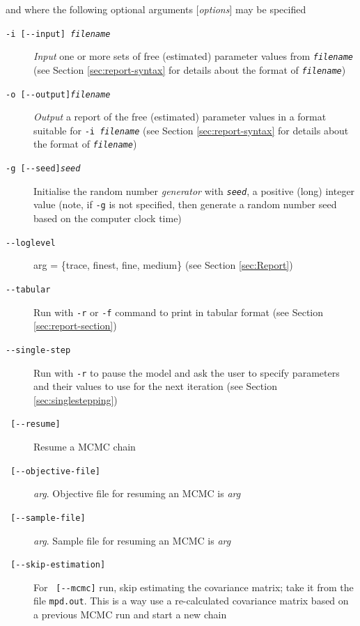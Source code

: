 and where the following optional arguments [\emph{options}] may be specified

\begin{description}
\item [\texttt{-i [-{}-input] \emph{filename}}] \emph{Input} one or more sets of free (estimated) parameter values from \texttt{\emph{filename}} (see Section \ref{sec:report-syntax} for details about the format of \texttt{\emph{filename}})

\item [\texttt{-o [-{}-output]\emph{filename}}] \emph{Output} a report of the free (estimated) parameter values in a format suitable for \texttt{-i \emph{filename}} (see Section \ref{sec:report-syntax} for details about the format of \texttt{\emph{filename}})

\item [\texttt{-g [-{}-seed]\emph{seed}}] Initialise the random number \emph{generator} with \texttt{\emph{seed}}, a positive (long) integer value (note, if \texttt{-g} is not specified, then \CNAME\will  generate a random number seed based on the computer clock time)

\item [\texttt{-{}-loglevel}] arg = \{trace, finest, fine, medium\} (see Section \ref{sec:Report})

\item [\texttt{-{}-tabular}] Run with \texttt{-r} or \texttt{-f}  command to print  in tabular format (see Section \ref{sec:report-section})

\item [\texttt{-{}-single-step}] Run with \texttt{-r} to pause the model and ask the user to specify parameters and their values to use for the next iteration (see Section \ref{sec:singlestepping})

\item [\texttt{   [-{}-resume] }] Resume a MCMC chain

\item [\texttt{   [-{}-objective-file] }] \emph{arg}. Objective file for resuming an MCMC is \emph{arg}

\item [\texttt{   [-{}-sample-file] }] \emph{arg}. Sample file for resuming an MCMC is \emph{arg}

\item [\texttt{   [-{}-skip-estimation] }] For \texttt{   [-{}-mcmc]} run, skip estimating the covariance matrix; take it from the file \texttt{mpd.out}. This is a way use a re-calculated covariance matrix based on a previous MCMC run and start a new chain


\end{description}
